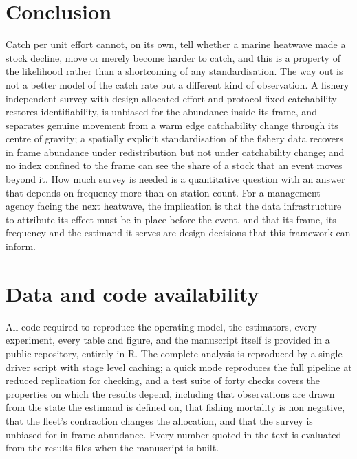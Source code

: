 \documentclass[
  11pt,
  a4paper,
]{article}
\begin{document}
\hypertarget{conclusion}{%
\section{Conclusion}\label{conclusion}}

Catch per unit effort cannot, on its own, tell whether a marine heatwave
made a stock decline, move or merely become harder to catch, and this is
a property of the likelihood rather than a shortcoming of any
standardisation. The way out is not a better model of the catch rate but
a different kind of observation. A fishery independent survey with
design allocated effort and protocol fixed catchability restores
identifiability, is unbiased for the abundance inside its frame, and
separates genuine movement from a warm edge catchability change through
its centre of gravity; a spatially explicit standardisation of the
fishery data recovers in frame abundance under redistribution but not
under catchability change; and no index confined to the frame can see
the share of a stock that an event moves beyond it. How much survey is
needed is a quantitative question with an answer that depends on
frequency more than on station count. For a management agency facing the
next heatwave, the implication is that the data infrastructure to
attribute its effect must be in place before the event, and that its
frame, its frequency and the estimand it serves are design decisions
that this framework can inform.

\hypertarget{data-and-code-availability}{%
\section*{Data and code availability}\label{data-and-code-availability}}

All code required to reproduce the operating model, the estimators,
every experiment, every table and figure, and the manuscript itself is
provided in a public repository, entirely in R. The complete analysis is
reproduced by a single driver script with stage level caching; a quick
mode reproduces the full pipeline at reduced replication for checking,
and a test suite of forty checks covers the properties on which the
results depend, including that observations are drawn from the state the
estimand is defined on, that fishing mortality is non negative, that the
fleet's contraction changes the allocation, and that the survey is
unbiased for in frame abundance. Every number quoted in the text is
evaluated from the results files when the manuscript is built.
\end{document}

